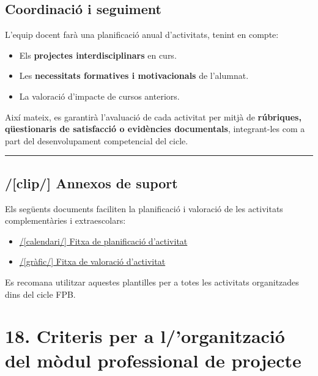 \documentclass[
  paper=a4,
  ,captions=tableheading
]{scrartcl}
\providecommand{\tightlist}{%
  \setlength{\itemsep}{0pt}\setlength{\parskip}{0pt}}
\begin{document}
\hypertarget{coordinaciuxf3-i-seguiment}{%
\subsection{Coordinació i seguiment}\label{coordinaciuxf3-i-seguiment}}

L'equip docent farà una planificació anual d'activitats, tenint en
compte:

\begin{itemize}
\tightlist
\item
  Els \textbf{projectes interdisciplinars} en curs.
\item
  Les \textbf{necessitats formatives i motivacionals} de l'alumnat.
\item
  La valoració d'impacte de cursos anteriors.
\end{itemize}

Així mateix, es garantirà l'avaluació de cada activitat per mitjà de
\textbf{rúbriques, qüestionaris de satisfacció o evidències
documentals}, integrant-les com a part del desenvolupament competencial
del cicle.

\begin{center}\rule{0.5\linewidth}{0.5pt}\end{center}

\hypertarget{clip-annexos-de-suport-1}{%
\subsection{/{[}clip/{]} Annexos de
suport}\label{clip-annexos-de-suport-1}}

Els següents documents faciliten la planificació i valoració de les
activitats complementàries i extraescolars:

\begin{itemize}
\tightlist
\item
  \href{../annexos/Annex-Planificacio-Activitat/}{/{[}calendari/{]}
  Fitxa de planificació d'activitat}
\item
  \href{../annexos/Annex-Valoracio-Activitat/}{/{[}gràfic/{]} Fitxa de
  valoració d'activitat}
\end{itemize}

Es recomana utilitzar aquestes plantilles per a totes les activitats
organitzades dins del cicle FPB.

\hypertarget{criteris-per-a-lorganitzaciuxf3-del-muxf2dul-professional-de-projecte}{%
\section{18. Criteris per a l/'organització del mòdul professional de
projecte}\label{criteris-per-a-lorganitzaciuxf3-del-muxf2dul-professional-de-projecte}}
\end{document}

